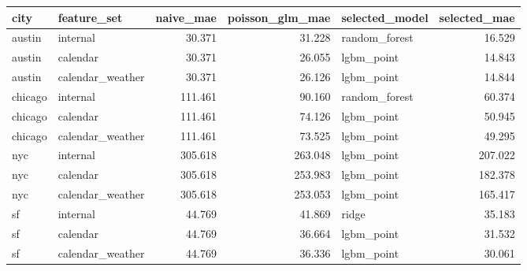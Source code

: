 \begin{tabular}{llrrlr}
\toprule
city & feature\_set & naive\_mae & poisson\_glm\_mae & selected\_model & selected\_mae \\
\midrule
austin & internal & 30.371 & 31.228 & random\_forest & 16.529 \\
austin & calendar & 30.371 & 26.055 & lgbm\_point & 14.843 \\
austin & calendar\_weather & 30.371 & 26.126 & lgbm\_point & 14.844 \\
chicago & internal & 111.461 & 90.160 & random\_forest & 60.374 \\
chicago & calendar & 111.461 & 74.126 & lgbm\_point & 50.945 \\
chicago & calendar\_weather & 111.461 & 73.525 & lgbm\_point & 49.295 \\
nyc & internal & 305.618 & 263.048 & lgbm\_point & 207.022 \\
nyc & calendar & 305.618 & 253.983 & lgbm\_point & 182.378 \\
nyc & calendar\_weather & 305.618 & 253.053 & lgbm\_point & 165.417 \\
sf & internal & 44.769 & 41.869 & ridge & 35.183 \\
sf & calendar & 44.769 & 36.664 & lgbm\_point & 31.532 \\
sf & calendar\_weather & 44.769 & 36.336 & lgbm\_point & 30.061 \\
\bottomrule
\end{tabular}
